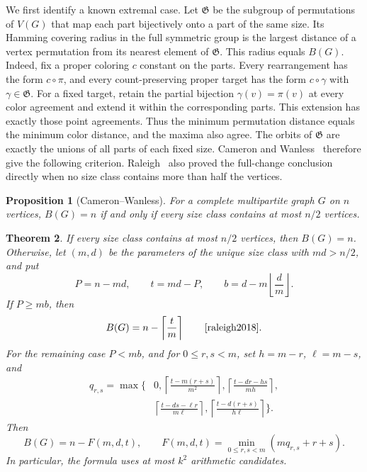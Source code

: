 \documentclass[10pt,a4paper]{amsart}
\numberwithin{equation}{section}
\newtheorem{theorem}{Theorem}[section]
\newtheorem{proposition}[theorem]{Proposition}
\theoremstyle{definition}
\theoremstyle{remark}
\begin{document}
We first identify a known extremal case. Let $\mathfrak G$ be the subgroup
of permutations of $V(G)$ that map each part bijectively onto a part of
the same size. Its Hamming covering radius in the full symmetric group
is the largest distance of a vertex permutation from its nearest element
of $\mathfrak G$. This radius equals $B(G)$.
Indeed, fix a proper coloring $c$ constant on the parts.
Every rearrangement has the form $c\circ\pi$, and every count-preserving
proper target has the form $c\circ\gamma$ with $\gamma\in\mathfrak G$.
For a fixed target, retain the partial bijection $\gamma(v)=\pi(v)$
at every color agreement and extend it within the corresponding parts.
This extension has exactly those point agreements. Thus the minimum
permutation distance equals the minimum color distance, and the maxima
also agree. The orbits of $\mathfrak G$ are exactly the unions of all
parts of each fixed size.
Cameron and Wanless~\cite[Theorem~14]{cameronwanless2005} therefore give
the following criterion. Raleigh~\cite[Theorem~1]{raleigh2018} also
proved the full-change conclusion directly when no size class contains
more than half the vertices.

\begin{proposition}[Cameron--Wanless]\label{cor:mp:full-change}
For a complete multipartite graph $G$ on $n$ vertices, $B(G)=n$ if and
only if every size class contains at most $n/2$ vertices.
\end{proposition}

\begin{theorem}\label{thm:mp:ordinary}
If every size class contains at most $n/2$ vertices, then $B(G)=n$.
Otherwise, let $(m,d)$ be the parameters of the unique size class with
$md>n/2$, and put
\[
 P=n-md,\qquad t=md-P,\qquad
 b=d-m\left\lfloor\frac d m\right\rfloor.
\]
If $P\ge mb$, then
\begin{equation}\label{eq:mp:raleigh-regime}
 B(G)=n-\left\lceil\frac t m\right\rceil
 \qquad\text{\cite[Theorem~4]{raleigh2018}}.
\end{equation}
For the remaining case $P<mb$, and for $0\le r,s<m$, set $h=m-r$,
$\ell=m-s$, and
\begin{equation}\label{eq:mp:ordinary-q}
\begin{split}
 q_{r,s}=\max\bigg\{&0,
 \left\lceil\frac{t-m(r+s)}{m^2}\right\rceil,
 \left\lceil\frac{t-dr-hs}{mh}\right\rceil,\\
 &\left\lceil\frac{t-ds-\ell r}{m\ell}\right\rceil,
 \left\lceil\frac{t-d(r+s)}{h\ell}\right\rceil\bigg\}.
\end{split}
\end{equation}
Then
\begin{equation}\label{eq:mp:ordinary}
 B(G)=n-F(m,d,t),\qquad
 F(m,d,t)=\min_{0\le r,s<m}(mq_{r,s}+r+s).
\end{equation}
In particular, the formula uses at most $k^2$ arithmetic candidates.
\end{theorem}
\end{document}
